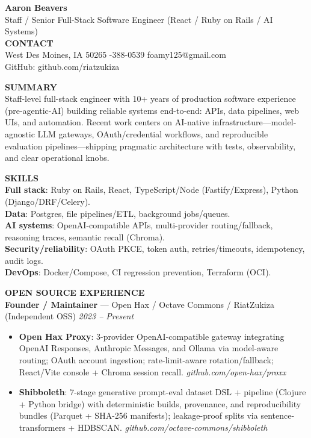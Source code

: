 \documentclass[10pt]{article}
\begin{document}
{\LARGE \textbf{Aaron Beavers}}\\
Staff / Senior Full-Stack Software Engineer (React / Ruby on Rails / AI Systems)\\

\vspace{2pt}
\textbf{CONTACT}\\
West Des Moines, IA 50265 \;\;\textbar\;-388-0539 \;\;\textbar\;\; foamy125@gmail.com\\
GitHub: github.com/riatzukiza

\vspace{6pt}
\textbf{SUMMARY}\\
Staff-level full-stack engineer with 10+ years of production software experience (pre-agentic-AI) building reliable systems end-to-end: APIs, data pipelines, web UIs, and automation. Recent work centers on AI-native infrastructure---model-agnostic LLM gateways, OAuth/credential workflows, and reproducible evaluation pipelines---shipping pragmatic architecture with tests, observability, and clear operational knobs.

\vspace{2pt}
\textbf{SKILLS}\\
\textbf{Full stack}: Ruby on Rails, React, TypeScript/Node (Fastify/Express), Python (Django/DRF/Celery).\\
\textbf{Data}: Postgres, file pipelines/ETL, background jobs/queues.\\
\textbf{AI systems}: OpenAI-compatible APIs, multi-provider routing/fallback, reasoning traces, semantic recall (Chroma).\\
\textbf{Security/reliability}: OAuth PKCE, token auth, retries/timeouts, idempotency, audit logs.\\
\textbf{DevOps}: Docker/Compose, CI regression prevention, Terraform (OCI).

\vspace{6pt}
\textbf{OPEN SOURCE EXPERIENCE}\\

\textbf{Founder / Maintainer} --- Open Hax / Octave Commons / RiatZukiza (Independent OSS) \hfill \textit{2023 -- Present}\\
\vspace{-6pt}
\begin{itemize}
  \setlength\itemsep{-2pt}
  \setlength\parskip{0pt}
  \setlength\parsep{0pt}
  \item \textbf{Open Hax Proxy}: 3-provider OpenAI-compatible gateway integrating OpenAI Responses, Anthropic Messages, and Ollama via model-aware routing; OAuth account ingestion; rate-limit-aware rotation/fallback; React/Vite console + Chroma session recall. \textit{github.com/open-hax/proxx}
  \item \textbf{Shibboleth}: 7-stage generative prompt-eval dataset DSL + pipeline (Clojure + Python bridge) with deterministic builds, provenance, and reproducibility bundles (Parquet + SHA-256 manifests); leakage-proof splits via sentence-transformers + HDBSCAN. \textit{github.com/octave-commons/shibboleth}
\end{itemize}
\end{document}
